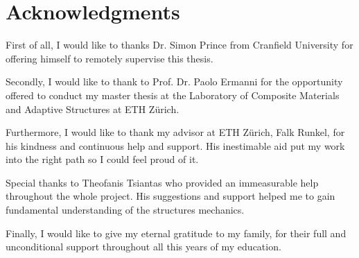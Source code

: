 \section*{Acknowledgments}
First of all, I would like to thanks Dr. Simon Prince from Cranfield University for offering himself to remotely supervise this thesis.

\noindent
Secondly, I would like to thank to Prof. Dr. Paolo Ermanni for the opportunity offered to conduct my master thesis at the Laboratory of Composite Materials and Adaptive Structures at ETH Z\"urich.

\noindent
Furthermore, I would like to thank my advisor at ETH Z\"urich, Falk Runkel, for his kindness and continuous help and support. His inestimable aid put my work into the right path so I could feel proud of it.

\noindent
Special thanks to Theofanis Tsiantas who provided an immeasurable help throughout the whole project. His suggestions and support helped me to gain fundamental understanding of the structures mechanics. 

\noindent
Finally, I would like to give my eternal gratitude to my family, for their full and unconditional support throughout all this years of my education.